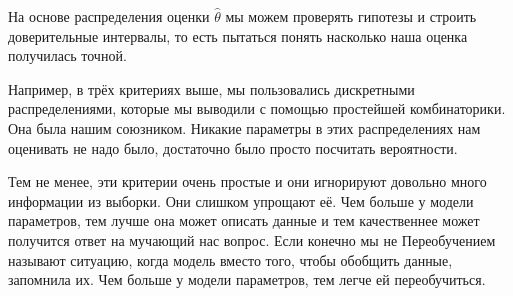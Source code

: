 \documentclass[12pt, a4paper, oneside]{article}
\begin{document}
На основе распределения оценки $\hat \theta$ мы можем проверять гипотезы и строить доверительные интервалы, то есть пытаться понять насколько наша оценка получилась точной. 

Например, в трёх критериях выше, мы пользовались дискретными распределениями, которые мы выводили с помощью простейшей комбинаторики. Она была нашим союзником. Никакие параметры в этих распределениях нам оценивать не надо было, достаточно было просто посчитать вероятности.

Тем не менее, эти критерии очень простые и они игнорируют довольно много информации из выборки. Они слишком упрощают её. Чем больше у модели параметров, тем лучше она может описать данные и тем качественнее может получится ответ на мучающий нас вопрос. Если конечно мы не  Переобучением называют ситуацию, когда модель вместо того, чтобы обобщить данные, запомнила их. Чем больше у модели параметров, тем легче ей переобучиться. 
\end{document}
